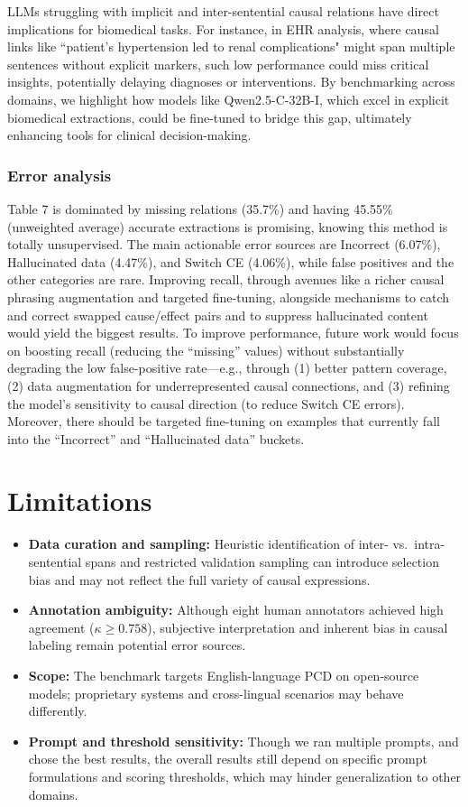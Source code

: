 \documentclass[conference]{IEEEtran}
\begin{document}
LLMs struggling with implicit and inter-sentential causal relations have direct implications for biomedical tasks. For instance, in EHR analysis, where causal links like ``patient's hypertension led to renal complications" might span multiple sentences without explicit markers, such low performance could miss critical insights, potentially delaying diagnoses or interventions. By benchmarking across domains, we highlight how models like Qwen2.5-C-32B-I, which excel in explicit biomedical extractions, could be fine-tuned to bridge this gap, ultimately enhancing tools for clinical decision-making.


\subsubsection{Error analysis}
Table 7 is dominated by missing relations (35.7\%) and having 45.55\% (unweighted average) accurate extractions is promising, knowing this method is totally unsupervised. The main actionable error sources are Incorrect (6.07\%), Hallucinated data (4.47\%), and Switch CE (4.06\%), while false positives and the other categories are rare. Improving recall, through avenues like a richer causal phrasing augmentation and targeted fine-tuning, alongside mechanisms to catch and correct swapped cause/effect pairs and to suppress hallucinated content would yield the biggest results. To improve performance, future work would focus on boosting recall (reducing the ``missing” values) without substantially degrading the low false-positive rate—e.g., through (1) better pattern coverage, (2) data augmentation for underrepresented causal connections, and (3) refining the model’s sensitivity to causal direction (to reduce Switch CE errors).  Moreover, there should be targeted fine-tuning on examples that currently fall into the “Incorrect” and “Hallucinated data” buckets.

\section{Limitations}
\begin{itemize}
  \item \textbf{Data curation and sampling:} Heuristic identification of inter- vs.\ intra-sentential spans and restricted validation sampling can introduce selection bias and may not reflect the full variety of causal expressions.
  \item \textbf{Annotation ambiguity:} Although eight human annotators achieved high agreement ($\kappa \ge 0.758$), subjective interpretation and inherent bias in causal labeling remain potential error sources.
  \item \textbf{Scope:} The benchmark targets English-language PCD on open-source models; proprietary systems and cross-lingual scenarios may behave differently.

  \item \textbf{Prompt and threshold sensitivity:} Though we ran multiple prompts, and chose the best results, the overall results still depend on specific prompt formulations and scoring thresholds, which may hinder generalization to other domains.
\end{itemize}
\end{document}

